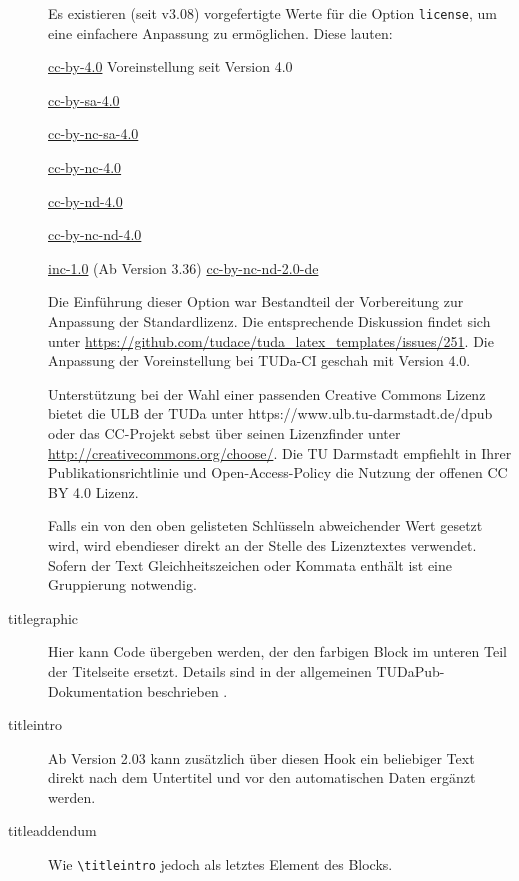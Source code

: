 \documentclass[
	german,%
	ruledheaders=chapter,%
	class=book,%
	thesis={%
			type=dr,
			dr=rernat
		},
	fontsize=11pt,%
	parskip=half-,%
	custommargins=true,%
	marginpar=false,%
	accentcolor=9c,%
]{tudapub}
\let\code\texttt
\let\tbs\textbackslash
\begin{document}
\begin{description}
	      Es existieren (seit v3.08) vorgefertigte Werte für die Option \verb|license|, um eine einfachere Anpassung zu ermöglichen. Diese lauten:

	      \parbox[t]{.5\linewidth}{%
		      \ttfamily
		      \href{https://creativecommons.org/licenses/by/4.0/}{cc-by-4.0} \textnormal{Voreinstellung seit Version 4.0}\par
		      \href{https://creativecommons.org/licenses/by-sa/4.0/}{cc-by-sa-4.0}\par
		      \href{https://creativecommons.org/licenses/by-nc-sa/4.0/}{cc-by-nc-sa-4.0}\par
		      \href{https://creativecommons.org/licenses/by-nc-/4.0/}{cc-by-nc-4.0}\par
	      }%
	      \parbox[t]{.5\linewidth}{
		      \ttfamily
		      \href{https://creativecommons.org/licenses/by-nd/4.0/}{cc-by-nd-4.0}\par
		      \href{https://creativecommons.org/licenses/by-nc-nd/4.0/}{cc-by-nc-nd-4.0}\par
		      \href{https://rightsstatements.org/page/InC/1.0/}{inc-1.0}\textnormal{ (Ab Version 3.36)}
		      \href{https://creativecommons.org/licenses/by-nc-nd/2.0/}{cc-by-nc-nd-2.0-de}\par
	      }

	      Die Einführung dieser Option war Bestandteil der Vorbereitung zur Anpassung der Standardlizenz.
	      Die entsprechende Diskussion findet sich unter \url{https://github.com/tudace/tuda_latex_templates/issues/251}. Die Anpassung der Voreinstellung bei TUDa-CI geschah mit Version 4.0.

	      Unterstützung bei der Wahl einer passenden Creative Commons Lizenz bietet die ULB der TUDa unter https://www.ulb.tu-darmstadt.de/dpub  oder  das CC-Projekt sebst über seinen Lizenzfinder unter \url{http://creativecommons.org/choose/}.
	      Die TU Darmstadt empfiehlt in Ihrer Publikationsrichtlinie und Open-Access-Policy die Nutzung der offenen CC BY 4.0 Lizenz.

	      Falls ein von den oben gelisteten Schlüsseln abweichender Wert gesetzt wird, wird ebendieser direkt an der Stelle des Lizenztextes verwendet. Sofern der Text Gleichheitszeichen oder Kommata enthält ist eine Gruppierung notwendig.
	\item[titlegraphic] Hier kann Code übergeben werden, der den farbigen Block im unteren Teil der Titelseite ersetzt. Details sind in der allgemeinen TUDaPub-Dokumentation beschrieben \cite{tudapub}.
	\item[titleintro] Ab Version 2.03 kann zusätzlich über diesen Hook ein beliebiger Text direkt nach dem Untertitel und vor den automatischen Daten ergänzt werden.
	\item[titleaddendum] Wie \code{\tbs{}titleintro} jedoch als letztes Element des Blocks.
\end{description}
\end{document}
